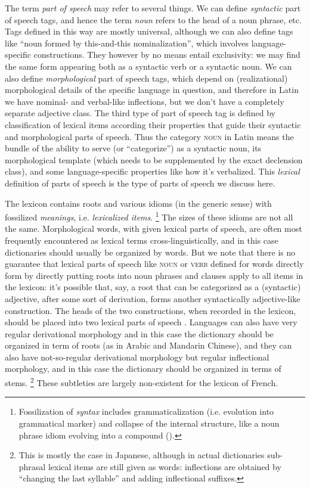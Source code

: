 \documentclass[a4paper, oneside, 12pt]{report}
\newcommand*{\citechap}[1]{chap.~{#1}}
\newcommand*{\term}[1]{\emph{#1}}
\newcommand*{\category}[1]{\textsc{#1}}
\begin{document}
The term \term{part of speech} may refer to several things.
We can define \emph{syntactic} part of speech tags,
and hence the term \term{noun} refers to the head of a noun phrase, etc.
Tags defined in this way are mostly universal,
although we can also define tags like ``noun formed by this-and-this nominalization'',
which involves language-specific constructions.
They however by no means entail exclusivity:
we may find the same form appearing both as a syntactic verb or a syntactic noun.
We can also define \emph{morphological} part of speech tags,
which depend on (realizational) morphological details of the specific language in question,
and therefore in Latin we have nominal- and verbal-like inflections,
but we don't have a completely separate adjective class.
The third type of part of speech tag is defined by classification of lexical items
according their properties that guide their syntactic and morphological parts of speech.
Thus the category \category{noun} in Latin means the bundle of 
the ability to serve (or ``categorize'') as a syntactic noun, its morphological template
(which needs to be supplemented by the exact declension class),
and some language-specific properties like how it's verbalized.
This \emph{lexical} definition of parts of speech is the type of parts of speech we discuss here.

The lexicon contains roots and various idioms (in the generic sense) with fossilized \emph{meanings},
i.e. \term{lexicalized items}.%
\footnote{
    Fossilization of \emph{syntax} includes grammaticalization (i.e. evolution into grammatical marker)
    and collapse of the internal structure,
    like a noun phrase idiom evolving into a compound
    ().
}
The sizes of these idioms are not all the same.
Morphological words, with given lexical parts of speech,
are often most frequently encountered as lexical terms cross-linguistically,
and in this case dictionaries should usually be organized by words.
But we note that there is no guarantee that lexical parts of speech like \category{noun} or \category{verb}
defined for words directly form by directly putting roots into noun phrases and clauses 
apply to all items in the lexicon:
it's possible that, say, a root that can be categorized as a (syntactic) adjective,
after some sort of derivation, forms another syntactically adjective-like construction.
The heads of the two constructions, when recorded in the lexicon,
should be placed into two lexical parts of speech \citep[\citechap{5}]{paul2014new}. 
Languages can also have very regular derivational morphology and in this case
the dictionary should be organized in term of roots (as in Arabic and Mandarin Chinese),
and they can also have not-so-regular derivational morphology but regular inflectional morphology,
and in this case the dictionary should be organized in terms of stems.%
\footnote{
    This is mostly the case in Japanese,
    although in actual dictionaries sub-phrasal lexical items are still given as words:
    inflections are obtained by ``changing the last syllable'' and adding inflectional suffixes.
}
These subtleties are largely non-existent for the lexicon of French.
\end{document}
